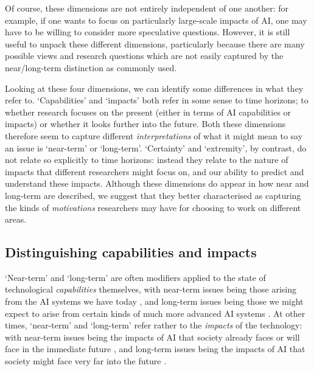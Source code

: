 \documentclass[sigconf]{acmart}
\begin{document}
Of course, these dimensions are not entirely independent of one another: for example, if one wants to focus on particularly large-scale impacts of AI, one may have to be willing to consider more speculative questions. However, it is still useful to unpack these different dimensions, particularly because there are many possible views and research questions which are not easily captured by the near/long-term distinction as commonly used. 

Looking at these four dimensions, we can identify some differences in what they refer to. `Capabilities' and `impacts' both refer in some sense to time horizons; to whether research focuses on the present (either in terms of AI capabilities or impacts) or whether it looks further into the future. Both these dimensions therefore seem to capture different \textit{interpretations} of what it might mean to say an issue is `near-term' or `long-term'. `Certainty' and `extremity', by contrast, do not relate so explicitly to time horizons: instead they relate to the nature of impacts that different researchers might focus on, and our ability to predict and understand  these impacts. Although these dimensions do appear in how near and long-term are described, we suggest that they better characterised as capturing the kinds of \textit{motivations} researchers may have for choosing to work on different areas.


\subsection{Distinguishing capabilities and impacts}

`Near-term' and `long-term' are often modifiers applied to the state of technological \textit{capabilities} themselves, with near-term issues being those arising from the AI systems we have today \cite{parson_artificial_2019}, and long-term issues being those we might expect to arise from certain kinds of much more advanced AI systems \cite{brundage_guide_2017}. At other times, `near-term' and `long-term' refer rather to the \textit{impacts} of the technology: with near-term issues being the impacts of AI that society already faces or will face in the immediate future \cite{brundage_guide_2017}, and long-term issues being the impacts of AI that society might face very far into the future \cite{cave_bridging_2019}.
\end{document}
